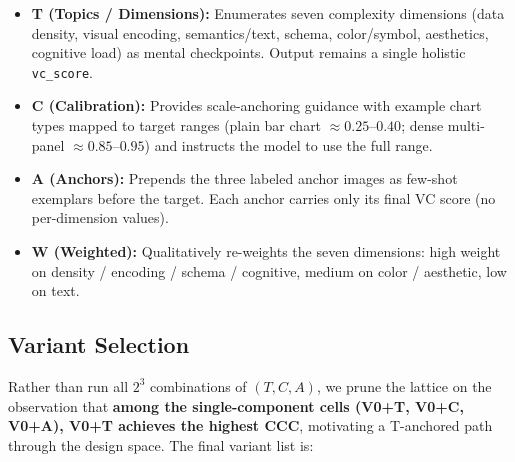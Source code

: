 \begin{itemize}
  \item \textbf{T (Topics / Dimensions):} Enumerates seven complexity
    dimensions (data density, visual encoding, semantics/text, schema,
    color/symbol, aesthetics, cognitive load) as mental checkpoints.
    Output remains a single holistic \texttt{vc\_score}.
  \item \textbf{C (Calibration):} Provides scale-anchoring guidance with
    example chart types mapped to target ranges (plain bar chart
    $\approx 0.25$--$0.40$; dense multi-panel $\approx 0.85$--$0.95$) and
    instructs the model to use the full range.
  \item \textbf{A (Anchors):} Prepends the three labeled anchor images as
    few-shot exemplars before the target. Each anchor carries only its
    final VC score (no per-dimension values).
  \item \textbf{W (Weighted):} Qualitatively re-weights the seven
    dimensions: high weight on density / encoding / schema / cognitive,
    medium on color / aesthetic, low on text.
\end{itemize}

\subsection{Variant Selection}
\label{app:vc-variants}

Rather than run all $2^3$ combinations of $(T, C, A)$, we prune the lattice
on the observation that \textbf{among the single-component cells (V0+T,
V0+C, V0+A), V0+T achieves the highest CCC}, motivating a T-anchored path
through the design space. The final variant list is:

